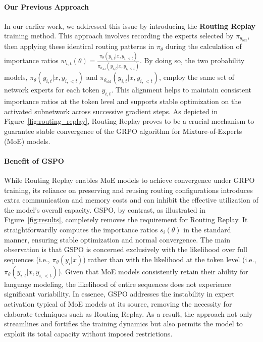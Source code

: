 \paragraph{Our Previous Approach} In our earlier work, we addressed this issue by introducing the \textbf{Routing Replay} training method. This approach involves recording the experts selected by $\pi_{\theta_\text{old}}$, then applying these identical routing patterns in $\pi_{\theta}$ during the calculation of importance ratios $w_{i,t}(\theta) = \frac{ \pi_{\theta} (y_{i,t} | x, y_{i,<t}) }{ \pi_{\theta_\text{old}} (y_{i,t} | x,y_{i,<t})}$. By doing so, the two probability models, $\pi_{\theta} (y_{i,t} | x, y_{i,<t})$ and $\pi_{\theta_\text{old}} (y_{i,t} | x,y_{i,<t})$, employ the same set of network experts for each token $y_{i,t}$. This alignment helps to maintain consistent importance ratios at the token level and supports stable optimization on the activated subnetwork across successive gradient steps. As depicted in Figure~\ref{fig:routing_replay}, Routing Replay proves to be a crucial mechanism to guarantee stable convergence of the GRPO algorithm for Mixture-of-Experts (MoE) models.

\paragraph{Benefit of GSPO} While Routing Replay enables MoE models to achieve convergence under GRPO training, its reliance on preserving and reusing routing configurations introduces extra communication and memory costs and can inhibit the effective utilization of the model's overall capacity. GSPO, by contrast, as illustrated in Figure~\ref{fig:results}, completely removes the requirement for Routing Replay. It straightforwardly computes the importance ratios $s_i(\theta)$ in the standard manner, ensuring stable optimization and normal convergence. The main observation is that GSPO is concerned exclusively with the likelihood over full sequences (i.e., $\pi_{\theta} (y_i | x)$) rather than with the likelihood at the token level (i.e., $\pi_{\theta} (y_{i,t} | x, y_{i,<t})$). Given that MoE models consistently retain their ability for language modeling, the likelihood of entire sequences does not experience significant variability. In essence, GSPO addresses the instability in expert activation typical of MoE models at its source, removing the necessity for elaborate techniques such as Routing Replay. As a result, the approach not only streamlines and fortifies the training dynamics but also permits the model to exploit its total capacity without imposed restrictions.

